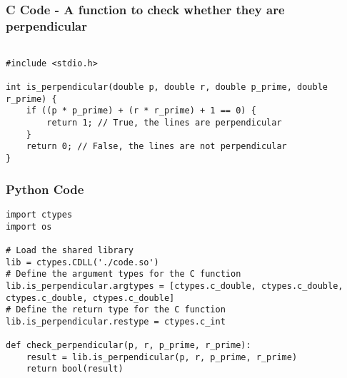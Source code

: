 \documentclass{beamer}
\begin{document}
\begin{frame}[fragile]
    \frametitle{C Code - A function to check whether they are perpendicular}

    \begin{lstlisting}

#include <stdio.h>

int is_perpendicular(double p, double r, double p_prime, double r_prime) {
    if ((p * p_prime) + (r * r_prime) + 1 == 0) {
        return 1; // True, the lines are perpendicular
    }
    return 0; // False, the lines are not perpendicular
}
    \end{lstlisting}
\end{frame}

\begin{frame}[fragile]
    \frametitle{Python Code}
    \begin{lstlisting}
import ctypes
import os

# Load the shared library
lib = ctypes.CDLL('./code.so')
# Define the argument types for the C function
lib.is_perpendicular.argtypes = [ctypes.c_double, ctypes.c_double, ctypes.c_double, ctypes.c_double]
# Define the return type for the C function
lib.is_perpendicular.restype = ctypes.c_int

def check_perpendicular(p, r, p_prime, r_prime):
    result = lib.is_perpendicular(p, r, p_prime, r_prime)
    return bool(result)

    \end{lstlisting}
\end{frame}
\end{document}
